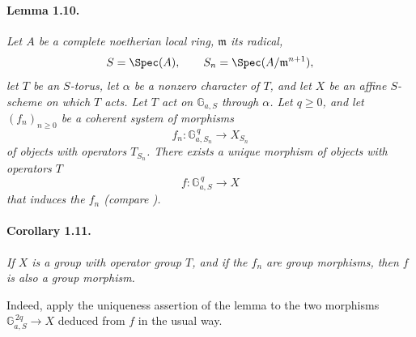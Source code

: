 \paragraph{\textbf{Lemma 1.10.}}
\emph{Let \(A\) be a complete noetherian local ring,
\(\mathfrak m\) its radical,
\[
  S=\Spec(A),\qquad S_n=\Spec(A/\mathfrak m^{n+1}),
\]
let \(T\) be an \(S\)-torus, let \(\alpha\) be a nonzero character
of \(T\), and let \(X\) be an affine \(S\)-scheme on which \(T\)
acts. Let \(T\) act on \(\mathbb G_{a,S}\) through \(\alpha\).
Let \(q\geq0\), and let \((f_n)_{n\geq0}\) be a coherent system of
morphisms}
\[
  f_n\colon\mathbb G_{a,S_n}^{\,q}\longrightarrow X_{S_n}
\]
\emph{of objects with operators \(T_{S_n}\). There exists a unique
morphism of objects with operators \(T\)}
\[
  f\colon\mathbb G_{a,S}^{\,q}\longrightarrow X
\]
\emph{that induces the \(f_n\) \textup{(compare )}.}

\paragraph{\textbf{Corollary 1.11.}}
\emph{If \(X\) is a group with operator group \(T\), and if the
\(f_n\) are group morphisms, then \(f\) is also a group morphism.}

Indeed, apply the uniqueness assertion of the lemma to the two
morphisms
\(\mathbb G_{a,S}^{\,2q}\to X\) deduced from \(f\) in the usual
way.

